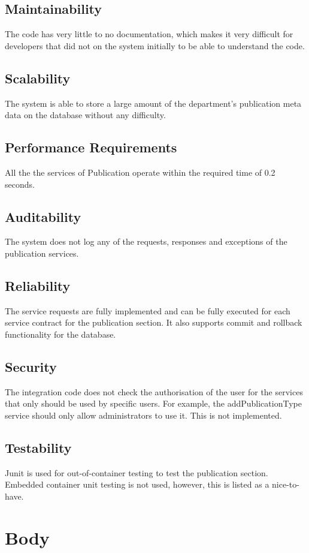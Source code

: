 \documentclass{article}
\begin{document}
    \subsection{Maintainability}
    The code has very little to no documentation, which makes it very difficult for developers that did not on the system initially to be able to understand the code.
    
    \subsection{Scalability}
    The system is able to store a large amount of the department's publication meta data on the database without any difficulty.
    
    \subsection{Performance Requirements}
    All the the services of Publication operate within the required time of 0.2 seconds.
    
    \subsection{Auditability}
    The system does not log any of the requests, responses and exceptions of the publication services.
    
    
    \subsection{Reliability}
    The service requests are fully implemented and can be fully executed for each service contract for the publication section. It also supports commit and rollback functionality for the database.
    
    \subsection{Security}
    The integration code does not check the authorisation of the user for the services that only should be used by specific users. For example, the addPublicationType service should only allow administrators to use it. This is not implemented.
    
    \subsection{Testability}
    Junit is used for out-of-container testing to test the publication section. Embedded container unit testing is not used, however, this is listed as a nice-to-have.
\section{Body}
\lipsum[1]
\end{document}
